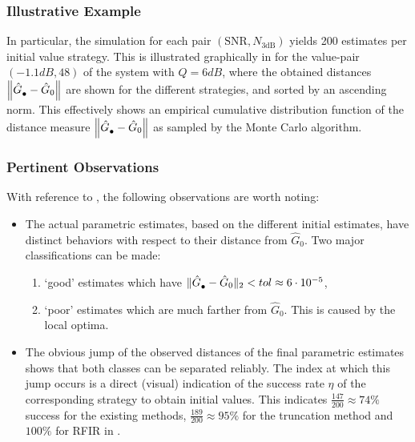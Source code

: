 \subsubsection{Illustrative Example}
In particular, the simulation for each pair $(\mathrm{SNR}, N_{3\mathrm{dB}})$ yields 200 estimates per initial value strategy.
This is illustrated graphically in  for the value-pair $(-1.1\unit{dB},48)$ of the system with $Q = 6 \unit{dB}$, where the obtained distances $\left\| \hat{G}_{\mathrm{\bullet}}^{\mathrm{}} - \hat{G}_{0} \right\|_{}$ are shown for the different strategies, and sorted by an ascending norm.
This effectively shows an empirical cumulative distribution function of the distance measure $\left\| \hat{G}_{\mathrm{\bullet}}^{\mathrm{}} - \hat{G}_{0} \right\|_{}$ as sampled by the Monte Carlo algorithm.%
 
\subsubsection{Pertinent Observations}
With reference to , the following observations are worth noting: 
\begin{itemize}
\item The actual parametric estimates, based on the different initial estimates, have distinct behaviors with respect to their distance from $\hat{G}_{0}$.
Two major classifications can be made:
\begin{enumerate}
  \item `good' estimates which have $\|\hat{G}_{\mathrm{\bullet}}^{\mathrm{}} - \hat{G}_{0} \|_2 < tol \approx 6 \cdot 10^{-5}$,
  \item `poor' estimates which are much farther from $\hat{G}_{0}$.  This is caused by the local optima.
\end{enumerate}
\item
The obvious jump of the observed distances of the final parametric estimates shows that both classes can be separated reliably.
The index at which this jump occurs is a direct (visual) indication of the success rate $\eta$ of the corresponding strategy to obtain initial values.
This indicates $\frac{147}{200} \approx 74\%$ success for the existing methods, $\frac{189}{200} \approx 95\%$ for the truncation method and $100\%$ for RFIR in .
\end{itemize}

